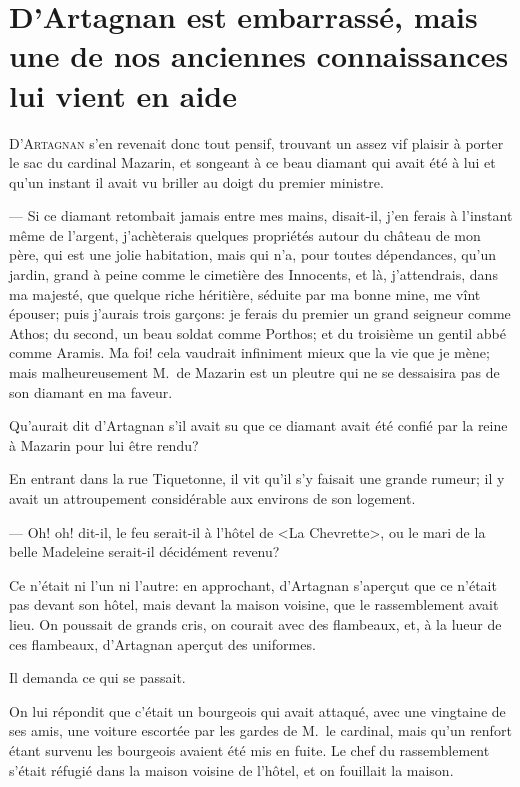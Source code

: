 \chapter[D'Artagnan est embarrassé]{D'Artagnan est embarrassé, mais une de nos anciennes connaissances lui vient en aide}

\lettrine{D}{'Artagnan} s'en revenait donc tout pensif, trouvant un assez vif plaisir à porter le sac du cardinal Mazarin, et songeant à ce beau diamant qui avait été à lui et qu'un instant il avait vu briller au doigt du premier ministre.

\zz
— Si ce diamant retombait jamais entre mes mains, disait-il, j'en ferais à l'instant même de l'argent, j'achèterais quelques propriétés autour du château de mon père, qui est une jolie habitation, mais qui n'a, pour toutes dépendances, qu'un jardin, grand à peine comme le cimetière des Innocents, et là, j'attendrais, dans ma majesté, que quelque riche héritière, séduite par ma bonne mine, me vînt épouser; puis j'aurais trois garçons: je ferais du premier un grand seigneur comme Athos; du second, un beau soldat comme Porthos; et du troisième un gentil abbé comme Aramis. Ma foi! cela vaudrait infiniment mieux que la vie que je mène; mais malheureusement M.~de Mazarin est un pleutre qui ne se dessaisira pas de son diamant en ma faveur.

Qu'aurait dit d'Artagnan s'il avait su que ce diamant avait été confié par la reine à Mazarin pour lui être rendu?

En entrant dans la rue Tiquetonne, il vit qu'il s'y faisait une grande rumeur; il y avait un attroupement considérable aux environs de son logement.

— Oh! oh! dit-il, le feu serait-il à l'hôtel de <La Chevrette>, ou le mari de la belle Madeleine serait-il décidément revenu?

Ce n'était ni l'un ni l'autre: en approchant, d'Artagnan s'aperçut que ce n'était pas devant son hôtel, mais devant la maison voisine, que le rassemblement avait lieu. On poussait de grands cris, on courait avec des flambeaux, et, à la lueur de ces flambeaux, d'Artagnan aperçut des uniformes.

Il demanda ce qui se passait.

On lui répondit que c'était un bourgeois qui avait attaqué, avec une vingtaine de ses amis, une voiture escortée par les gardes de M.~le cardinal, mais qu'un renfort étant survenu les bourgeois avaient été mis en fuite. Le chef du rassemblement s'était réfugié dans la maison voisine de l'hôtel, et on fouillait la maison.


